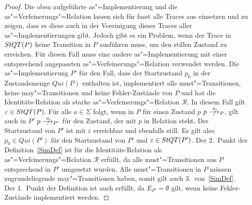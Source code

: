 \begin{proof}
  Die oben aufgeführte as"=Implementierung und die as"=Verfeinerungs"=Relation
  lassen sich für fasst alle Traces aus \StQT{} einsetzen und zu zeigen, dass
  es diese auch in der Vereinigung dieser Traces aller as"=Implementierungen
  gibt. Jedoch gibt es ein Problem, wenn der Trace in $StQT (P)$ keine
  Transition in $P$ ausführen muss, um den stillen Zustand zu erreichen. Für
  diesen Fall muss eine andere as"=Implementierung mit einer entsprechend
  angepassten as"=Verfeinerungs"=Relation verwendet werden. Die
  as"=Implementierung $P'$ für den Fall, dass der Startzustand $p_0$ in der
  Zustandsmenge $Qui (P)$ enthalten ist, implementiert alle must"=Transitionen,
  keine may"=Transitionen und keine Fehler-Zustände von $P$ und hat die
  Identitäts-Relation als starke as"=Verfeinerungs"=Relation $\mathcal{R}$. In
  diesem Fall gilt $\varepsilon\in StQT (P)$. Für alle $a\in\Sigma$ folgt, wenn
  in $P$ für einen Zustand $p$ $p\nmust[a]_P$, gilt auch in $P'$ $p
  \nmust[a]_{P'}$ für den Zustand, der mit $p$ in Relation steht. Der
  Startzustand von $P'$ ist mit $\varepsilon$ erreichbar und ebenfalls still.
  Es gilt also $p_0\in Qui (P')$ für den Startzustand von $P'$ und
  $\varepsilon\in StQT (P')$. Der 2.\ Punkt der Definition~\ref{SimDef} ist für
  die Identitäts-Relation als as"=Verfeinerungs"=Relation $\mathcal{R}$
  erfüllt, da alle must"=Transitionen aus $P$ entsprechend in $P'$ umgesetzt
  wurden. Alle must"=Transitionen in $P$ müssen zugrundeliegende
  may"=Transitionen haben, somit gilt auch 3.\ von~\ref{SimDef}. Der 1.\ Punkt
  der Definition ist auch erfüllt, da $E_{P'}=\emptyset$ gilt, wenn keine
  Fehler-Zustände implementiert werden.
\end{proof}

